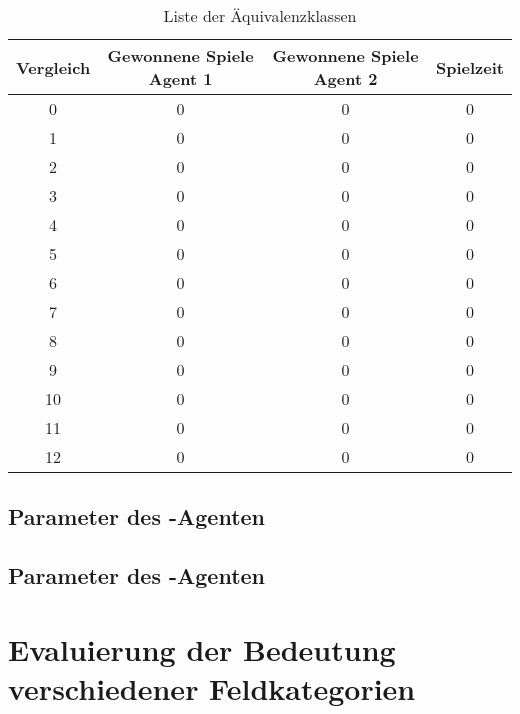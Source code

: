\begin{table}[ht]
\begin{center}
\begin{tabular}{| c | c | c | c |} \hline
Vergleich & Gewonnene Spiele Agent 1 & Gewonnene Spiele Agent 2 & Spielzeit \\ \hline
\hline
0 & 0 & 0 & 0  \\ \hline
1 & 0 & 0 & 0  \\ \hline
2 & 0 & 0 & 0  \\ \hline
3 & 0 & 0 & 0  \\ \hline
4 & 0 & 0 & 0  \\ \hline
5 & 0 & 0 & 0  \\ \hline
6 & 0 & 0 & 0  \\ \hline
7 & 0 & 0 & 0  \\ \hline
8 & 0 & 0 & 0  \\ \hline
9 & 0 & 0 & 0  \\ \hline
10 & 0 & 0 & 0  \\ \hline
11 & 0 & 0 & 0  \\ \hline
12 & 0 & 0 & 0  \\ \hline
\end{tabular}
\end{center}
\caption{Liste der Äquivalenzklassen}
\label{tbl:cmp-results}
\end{table}

\subsection*{Parameter des -Agenten}
\label{eval:agents:params:subsec-mc}

\subsection*{Parameter des -Agenten}
\label{eval:agents:params:subsec-ab}


\section{Evaluierung der Bedeutung verschiedener Feldkategorien}

